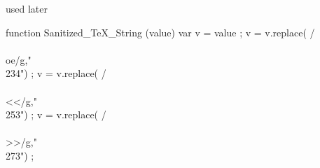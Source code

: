 

 used later 

  function Sanitized_TeX_String (value)
    { var v = value ;
      v = v.replace(  /\\\\oe/g,"\\234") ; 
      v = v.replace(  /\\\\<</g,"\\253") ;
      v = v.replace(  /\\\\>>/g,"\\273") ;
}
